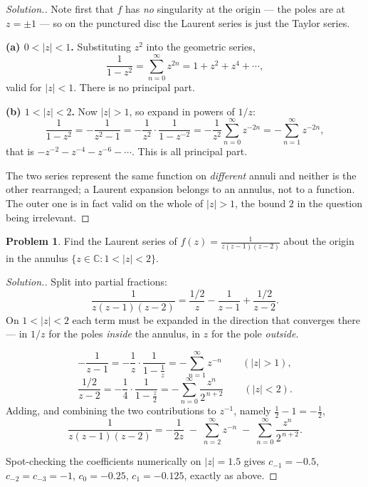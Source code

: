 \documentclass[11pt,a4paper]{article}
\theoremstyle{definition}
\newtheorem{problemx}{Problem}[section]
\newenvironment{problem}{\begin{problemx}}{\end{problemx}}
\newenvironment{solution}
  {\renewcommand{\qedsymbol}{}\begin{proof}[\textit{Solution}.]}
  {\end{proof}}
\begin{document}
\begin{solution}
Note first that $f$ has \emph{no} singularity at the origin --- the poles are at
$z = \pm 1$ --- so on the punctured disc the Laurent series is just the Taylor
series.

\textbf{(a) $0 < \left|z\right| < 1$.} Substituting $z^{2}$ into the geometric
series,
$$\frac{1}{1-z^{2}} = \sum^{\infty}_{n=0} z^{2n}
= 1 + z^{2} + z^{4} + \cdots,$$
valid for $\left|z\right| < 1$. There is no principal part.

\textbf{(b) $1 < \left|z\right| < 2$.} Now $\left|z\right| > 1$, so expand in
powers of $1/z$:
$$\frac{1}{1-z^{2}} = -\frac{1}{z^{2}-1}
= -\frac{1}{z^{2}}\cdot\frac{1}{1 - z^{-2}}
= -\frac{1}{z^{2}}\sum^{\infty}_{n=0} z^{-2n}
= -\sum^{\infty}_{n=1} z^{-2n},$$
that is $-z^{-2} - z^{-4} - z^{-6} - \cdots$. This is all principal part.

The two series represent the same function on \emph{different} annuli and neither
is the other rearranged; a Laurent expansion belongs to an annulus, not to a
function. The outer one is in fact valid on the whole of $\left|z\right| > 1$, the
bound $2$ in the question being irrelevant.
\end{solution}


\begin{problem}
Find the Laurent series of $f(z) = \frac{1}{z(z-1)(z-2)}$ about the origin in
the annulus $\{z \in \mathbb{C} : 1 < \left|z\right| < 2\}$.
\end{problem}

\begin{solution}
Split into partial fractions:
$$\frac{1}{z(z-1)(z-2)} = \frac{1/2}{z} - \frac{1}{z-1} + \frac{1/2}{z-2}.$$
On $1 < \left|z\right| < 2$ each term must be expanded in the direction that
converges there --- in $1/z$ for the poles \emph{inside} the annulus, in $z$ for the
pole \emph{outside}.

$$-\frac{1}{z-1} = -\frac{1}{z}\cdot\frac{1}{1-\frac1z}
= -\sum^{\infty}_{n=1} z^{-n} \qquad \left(\left|z\right|>1\right),$$
$$\frac{1/2}{z-2} = -\frac{1}{4}\cdot\frac{1}{1-\frac z2}
= -\sum^{\infty}_{n=0}\frac{z^{n}}{2^{\,n+2}} \qquad \left(\left|z\right|<2\right).$$
Adding, and combining the two contributions to $z^{-1}$, namely
$\frac12 - 1 = -\frac12$,
$$\boxed{\frac{1}{z(z-1)(z-2)}
= -\frac{1}{2z} \;-\; \sum^{\infty}_{n=2} z^{-n}
\;-\; \sum^{\infty}_{n=0}\frac{z^{n}}{2^{\,n+2}} .}$$

Spot-checking the coefficients numerically on $\left|z\right| = 1.5$ gives
$c_{-1} = -0.5$, $c_{-2} = c_{-3} = -1$, $c_0 = -0.25$, $c_1 = -0.125$, exactly as
above.
\end{solution}
\end{document}
